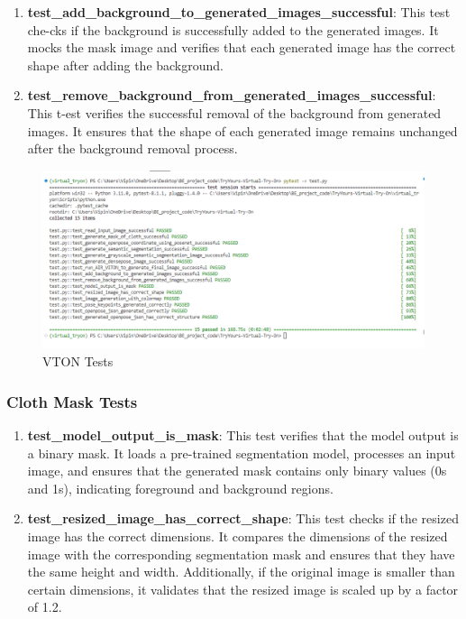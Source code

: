 \begin{enumerate}
        \item \textbf{test\_add\_background\_to\_generated\_images\_successful}: This test che-cks if the background is successfully added to the generated images. It mocks the mask image and verifies that each generated image has the correct shape after adding the background.
        
        \item \textbf{test\_remove\_background\_from\_generated\_images\_successful}: This t-est verifies the successful removal of the background from generated images. It ensures that the shape of each generated image remains unchanged after the background removal process.
    \end{enumerate}

    \begin{figure}
        \includegraphics[width=\textwidth]{components/images/vton_tests.png}
        \caption{VTON Tests}
        \label{fig:test-case-vton}
    \end{figure}

    \subsubsection{Cloth Mask Tests}

    \begin{enumerate}
        \item \textbf{test\_model\_output\_is\_mask}: This test verifies that the model output is a binary mask. It loads a pre-trained segmentation model, processes an input image, and ensures that the generated mask contains only binary values (0s and 1s), indicating foreground and background regions.
        
        \item \textbf{test\_resized\_image\_has\_correct\_shape}: This test checks if the resized image has the correct dimensions. It compares the dimensions of the resized image with the corresponding segmentation mask and ensures that they have the same height and width. Additionally, if the original image is smaller than certain dimensions, it validates that the resized image is scaled up by a factor of 1.2.
    \end{enumerate}


